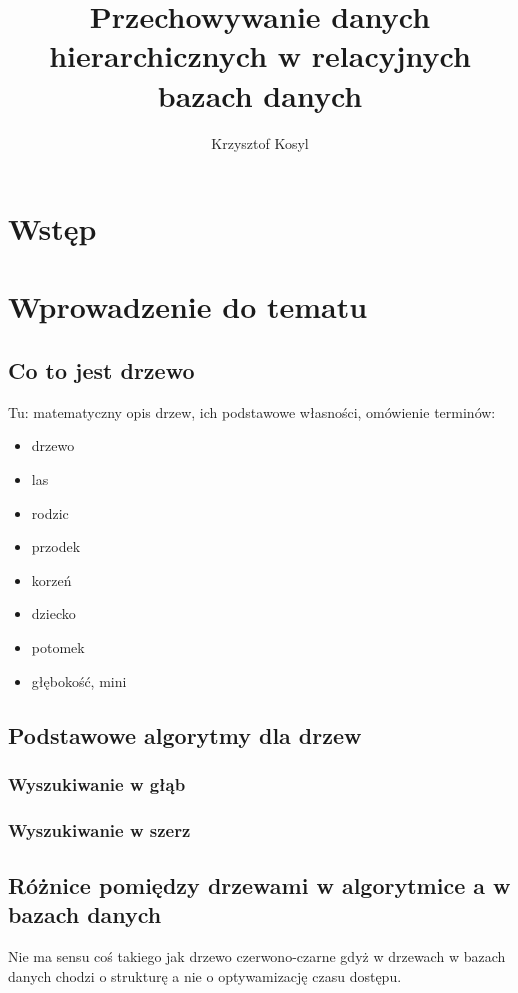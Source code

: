\documentclass[10pt,a4paper,oneside]{book}
\author{Krzysztof Kosyl}
\title{Przechowywanie danych hierarchicznych w relacyjnych bazach danych}
\begin{document}



\tableofcontents{}

\chapter*{Wstęp}




\chapter{Wprowadzenie do tematu}

\section{Co to jest drzewo}

Tu: matematyczny opis drzew, ich podstawowe własności, omówienie terminów:
\begin{itemize}
	\item drzewo
	\item las
	\item rodzic
	\item przodek
	\item korzeń
	\item dziecko
	\item potomek
	\item głębokość, mini
\end{itemize}



\section{Podstawowe algorytmy dla drzew}
\subsection{Wyszukiwanie w głąb}
\subsection{Wyszukiwanie w szerz}


\section{Różnice pomiędzy drzewami w algorytmice a w bazach danych}

Nie ma sensu coś takiego jak drzewo czerwono-czarne gdyż w drzewach w bazach danych chodzi o strukturę a nie o optywamizację czasu dostępu.
\end{document}
